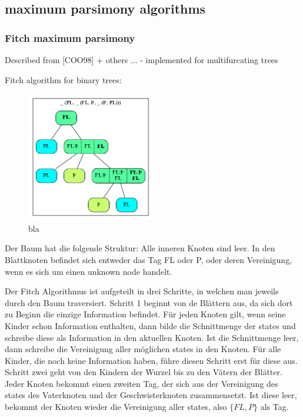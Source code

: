     \subsection{maximum parsimony algorithms}
      \subsubsection{Fitch maximum parsimony}
        Described from [COO98] + others ... - implemented for multifurcating trees

        Fitch algorithm for binary trees:
        \begin{figure}
          \caption{bla}
          \centering
            \includegraphics[width=0.5\textwidth]{Figures/Fitch1.png}
        \end{figure}

        Der Baum hat die folgende Struktur: Alle inneren Knoten sind leer. In den Blattknoten befindet 
        sich entweder das Tag FL oder P, oder deren Vereinigung, wenn es sich um einen unknown node handelt.

        Der Fitch Algorithmus ist aufgeteilt in drei Schritte, in welchen man jeweils durch den Baum traversiert.
        Schritt 1 beginnt von de Blättern aus, da sich dort zu Beginn die einzige Information befindet. 
        Für jeden Knoten gilt, wenn seine Kinder schon Information enthalten, dann bilde die Schnittmenge 
        der states und schreibe diese als Information in den aktuellen Knoten. Ist die Schnittmenge leer, 
        dann schreibe die Vereinigung aller möglichen states in den Knoten. Für alle Kinder, die noch keine 
        Information haben, führe diesen Schritt erst für diese aus.
        Schritt zwei geht von den Kindern der Wurzel bis zu den Vätern der Blätter. Jeder Knoten bekommt 
        einen zweiten Tag, der sich aus der Vereinigung des states des Vaterknoten und der Geschwisterknoten
        zusammensetzt. Ist diese leer, bekommt der Knoten wieder die Vereinigung aller states, also $\{FL,P\}$ als Tag.

